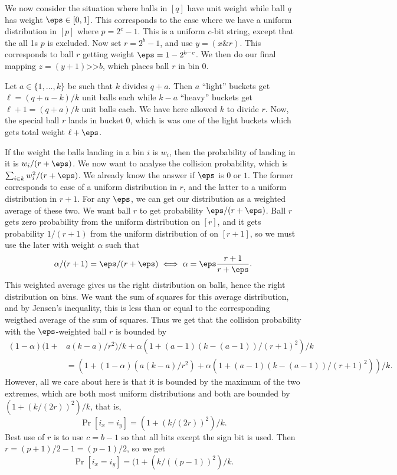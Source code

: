 We now consider the situation where balls in $[q]$ have unit weight while ball $q$
has weight $\eps\in[0,1]$. This corresponds to the case where we have a uniform
distribution in $[p]$ where $p=2^c-1$. This is a uniform $c$-bit string, except
that the all 1s $p$ is excluded. Now set $r=2^b-1$, and use $y=(x\texttt{\&} r)$.
This corresponds to ball $r$ getting weight $\eps=1-2^{b-c}$. We then do
our final mapping $z=(y+1)\texttt{>>} b$, which places ball $r$ in bin $0$.

Let $a\in\{1,\ldots,k\}$ be such that $k$ divides $q+a$. Then $a$ ``light'' buckets
get $\ell=(q+a-k)/k$ unit balls each while $k-a$ ``heavy'' buckets 
get $\ell+1=(q+a)/k$ unit balls each. We have here allowed $k$ to divide $r$.
Now, the special ball $r$ lands in bucket 0, which is was one of
the light buckets which gets total weight $\ell+\eps$. 

If the weight the balls landing in a bin $i$ is $w_i$, then the probability
of landing in it is $w_i/(r+\eps)$. We now want to
analyse the collision probability, which is $\sum_{i\in k} w_i^2/(r+\eps)$.
We already know the answer if $\eps$ is $0$ or $1$. The former corresponds
to case of a uniform distribution in $r$, and the latter to a uniform
distribution in $r+1$. For any $\eps$, we can get our distribution as
a weighted average of these two. We want ball $r$ to get probability $\eps/(r+\eps)$.
Ball $r$ gets zero probability from the uniform distribution on $[r]$, and it gets
probability $1/(r+1)$ from the uniform distribution of on $[r+1]$, so we
must use the later with weight $\alpha$ such that 
\[\alpha/(r+1)=\eps/(r+\eps)\iff \alpha=\eps\frac{r+1}{r+\eps}.\]
This weighted average gives us the right distribution on balls, hence the
right distribution on bins. We want the sum of squares for this average distribution,
and by Jensen's inequality, this is less than or equal to the corresponding
weigthed average of the sum of squares. Thus we
get that the collision probability with the $\eps$-weighted ball $r$ is
bounded by 
\begin{align*}
(1-\alpha)(1+&a(k-a)/r^2)/k+\alpha (1+(a-1)(k-(a-1))/(r+1)^2)/k\\
&=(1+(1-\alpha)(a(k-a)/r^2)+\alpha (1+(a-1)(k-(a-1))/(r+1)^2))/k.
\end{align*}
However, all we care about here is that it is bounded by the maximum 
of the two extremes, which are both most uniform distributions
and both are bounded by $(1+(k/(2r))^2)/k$, that is,
\begin{equation}\label{eq:collision-r}
\Pr[i_x=i_y]=(1+(k/(2r))^2)/k.
\end{equation}
Best use of $r$ is to use $c=b-1$ so that all bits except the sign bit is used.
Then $r=(p+1)/2-1=(p-1)/2$, so we get
\begin{equation}\label{eq:collision-p}
\Pr[i_x=i_y]=(1+(k/((p-1))^2)/k.
\end{equation}






